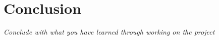
\section{Conclusion}\label{sec:conclusion}
    \emph{Conclude with what you have learned through working on the project}